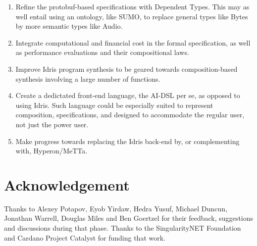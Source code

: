 \documentclass[]{report}
\begin{document}
\begin{enumerate}
\item Refine the protobuf-based specifications with Dependent Types.
  This may as well entail using an ontology, like SUMO, to replace
  general types like Bytes by more semantic types like Audio.
\item Integrate computational and financial cost in the formal
  specification, as well as performance evaluations and their
  compositional laws.
\item Improve Idris program synthesis to be geared towards
  composition-based synthesis involving a large number of functions.
\item Create a dedictated front-end language, the AI-DSL per se, as
  opposed to using Idris.  Such language could be especially suited to
  represent composition, specifications, and designed to accommodate
  the regular user, not just the power user.
\item Make progress towards replacing the Idris back-end by, or
  complementing with, Hyperon/MeTTa.
\end{enumerate}

\section{Acknowledgement}

Thanks to Alexey Potapov, Eyob Yirdaw, Hedra Yusuf, Michael Duncun,
Jonathan Warrell, Douglas Miles and Ben Goertzel for their feedback,
suggestions and discussions during that phase.  Thanks to the
SingularityNET Foundation and Cardano Project Catalyst for funding
that work.




\end{document}
